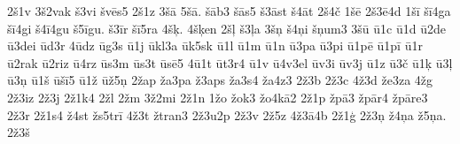 {{2\v{s}1v 3\v{s}2vak \v{s}3vi \v{s}v\={e}s5 2\v{s}1z 3\v{s}\={a}
5\v{s}\={a}. \v{s}\={a}b3 \v{s}\={a}s5 \v{s}3\={a}st
\v{s}4\={a}t 2\v{s}4\v{c} 1\v{s}\={e} 2\v{s}3\={e}4d
1\v{s}\={i} \v{s}\={i}4ga \v{s}\={i}4gi \v{s}4\={i}4gu
\v{s}5\={i}gu. \v{s}3\={i}r \v{s}\={i}5ra 4\v{s}\c{k}.
4\v{s}\c{k}en 2\v{s}\c{l} \v{s}3\c{l}a 3\v{s}\c{n} \v{s}4\c{n}i
\v{s}\c{n}um3 3\v{s}\={u} \={u}1c \={u}1d \={u}2de \={u}3dei
\={u}d3r 4\={u}dz \={u}g3s \={u}1j \={u}kl3a \={u}k5sk \={u}1l
\={u}1m \={u}1n \={u}3pa \={u}3pi \={u}1p\={e} \={u}1p\={i}
\={u}1r \={u}2rak \={u}2riz \={u}4rz \={u}s3m \={u}s3t
\={u}s\={e}5 4\={u}1t \={u}t3r4 \={u}1v \={u}4v3el \={u}v3i
\={u}v3j \={u}1z \={u}3\v{c} \={u}1\c{k} \={u}3\c{l} \={u}3\c{n}
\={u}1\v{s} \={u}\v{s}\={i}5 \={u}1\v{z} \={u}\v{z}5\c{n}
2\v{z}ap \v{z}a3pa \v{z}3aps \v{z}a3s4 \v{z}a4z3
2\v{z}3b 2\v{z}3c 4\v{z}3d \v{z}e3za 4\v{z}g 2\v{z}3iz 2\v{z}3j
2\v{z}1k4 2\v{z}l 2\v{z}m 3\v{z}2mi 2\v{z}1n 1\v{z}o \v{z}ok3
\v{z}o4k\={a}2 2\v{z}1p \v{z}p\={a}3 \v{z}p\={a}r4 \v{z}p\={a}re3
2\v{z}3r 2\v{z}1s4 \v{z}4st \v{z}s5tr\={i} 4\v{z}3t
\v{z}tran3 2\v{z}3u2p 2\v{z}3v 2\v{z}5z 4\v{z}3\={a}4b 2\v{z}1\c{g}
2\v{z}3\c{n} \v{z}4\c{n}a \v{z}5\c{n}a. 2\v{z}3\v{s}
} 
}

